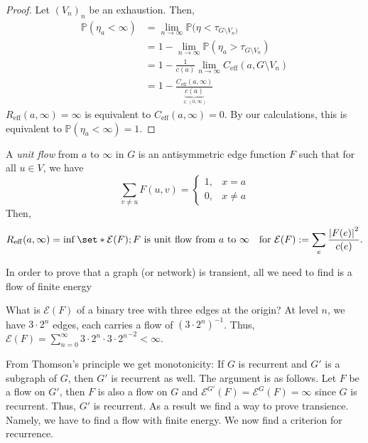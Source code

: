 \begin{proof}
    Let \((V_n)_n\) be an exhaustion. Then,
    \begin{align*}
      \mathbb{P}(\eta_a < \infty ) &= \lim_{n \to \infty} \mathbb{P}(\eta< \tau_{G \setminus V_n)} \\
                                   &=1-\lim_{n \to \infty} \mathbb{P}(\eta_a > \tau_{G \setminus V_n}) \\
                                   &=1 - \frac{1}{c(a)}\lim_{n \to \infty} C_{\mathrm{eff}}(a, G \setminus V_n) \\
                                   &=1- \frac{C_{\mathrm{eff}}(a, \infty )}{\underbrace{c(a)}_{\in (0,\infty )}}
    \end{align*}
  \(R_{\mathrm{eff}}(a, \infty ) = \infty \)  is equivalent to \(C_{\mathrm{eff}}(a, \infty )=0\). By our calculations, this is equivalent to \(\mathbb{P}(\eta_a < \infty )=1\).
\end{proof}

\begin{thm}
    A \emph{unit flow} from \(a\) to \(\infty \) in \(G\) is an antisymmetric edge function \(F\) such that for all \(u \in  V\), we have 
    \[\sum_{v \neq u}^{} F(u,v)= 
    \begin{cases}
      1, & x=a \\
      0, & x \neq a 
    \end{cases}
    \]
    Then, \[R_{\mathrm{eff}}(a, \infty ) =\inf_{} \set*{\mathcal{E}(F); F \text{ is unit flow from \(a\) to \(\infty \)}} \quad \txt{for }\mathcal{E}(F):= \sum_{e}^{} \frac{\abs{F(e)} ^2}{c(e)}. \]
\end{thm}


\begin{remark}[]
    In order to prove that a graph (or network) is transient, all we need to find is a flow of finite energy
\end{remark}


\begin{exm}
    What is \(\mathcal{E}(F)\) of a binary tree with three edges at the origin? At level \(n\), we have \(3 \cdot 2^n\) edges, each carries a flow of \((3 \cdot 2^n)^{-1}\). Thus, \(\mathcal{E}(F)= \sum_{n=0}^{\infty} 3 \cdot 2^n \cdot {3 \cdot 2^n}^{-2} < \infty \).
\end{exm}

From Thomson's principle we get monotonicity: If \(G\) is recurrent and \(G'\) is a subgraph of \(G\), then \(G'\) is recurrent as well. The argument is as follows. Let \(F\) be a flow on \(G'\), then \(F\) is also a flow on \(G\) and \(\mathcal{E}^{G'}(F) = \mathcal{E}^{G}(F)= \infty \) since \(G\) is recurrent. Thus, \(G'\) is recurrent. As a result we find a way to prove transience. Namely, we have to find a flow with finite energy. We now find a criterion for recurrence.


